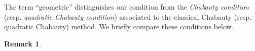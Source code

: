 \documentclass[11pt,oneside]{amsart}
\theoremstyle{plain}
\theoremstyle{definition}
\newtheorem{remark}[theorem]{Remark}
\DeclareMathOperator{\spec}{Spec} \DeclareMathOperator{\sgn}{sign}
\DeclareMathOperator{\rank}{rank} \DeclareMathOperator{\rig}{rig}
\def\Z{\mathbb{Z}}
\def\oh{\mathcal{O}}
\begin{document}
The term ``geometric'' distinguishes our condition from the {\it Chabauty condition} (resp. {\it quadratic Chabauty condition}) associated to the classical Chabauty (resp. quadratic Chabauty) method. We briefly compare these conditions below. 

\begin{remark} \label{remark:chabcondition}


\end{remark}
\end{document}
